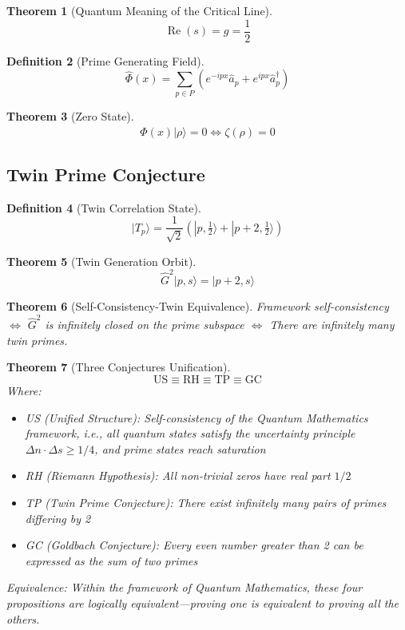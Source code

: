 \documentclass[12pt]{article}
\newtheorem{theorem}{Theorem}[section]
\theoremstyle{definition}
\newtheorem{definition}[theorem]{Definition}
\begin{document}
\begin{theorem}[Quantum Meaning of the Critical Line]
\[
\operatorname{Re}(s) = g = \frac{1}{2}
\]
\end{theorem}

\begin{definition}[Prime Generating Field]
\[
\hat{\Phi}(x) = \sum_{p \in P} \left( e^{-ipx} \hat{a}_p + e^{ipx} \hat{a}_p^\dagger \right)
\]
\end{definition}

\begin{theorem}[Zero State]
\[
\hat{\Phi}(x)|\rho\rangle = 0 \iff \zeta(\rho) = 0
\]
\end{theorem}

\subsection{Twin Prime Conjecture}

\begin{definition}[Twin Correlation State]
\[
|T_p\rangle = \frac{1}{\sqrt{2}} \left( |p, \tfrac{1}{2}\rangle + |p+2, \tfrac{1}{2}\rangle \right)
\]
\end{definition}

\begin{theorem}[Twin Generation Orbit]
\[
\hat{G}^2|p,s\rangle = |p+2,s\rangle
\]
\end{theorem}

\begin{theorem}[Self-Consistency-Twin Equivalence]
Framework self-consistency \(\iff\) \(\hat{G}^2\) is infinitely closed on the prime subspace \(\iff\) There are infinitely many twin primes.
\end{theorem}

\begin{theorem}[Three Conjectures Unification]
\[
\boxed{\text{US} \equiv \text{RH} \equiv \text{TP} \equiv \text{GC}}
\]
Where:
\begin{itemize}
    \item US (Unified Structure): Self-consistency of the Quantum Mathematics framework, i.e., all quantum states satisfy the uncertainty principle \(\Delta n \cdot \Delta s \geq 1/4\), and prime states reach saturation
    \item RH (Riemann Hypothesis): All non-trivial zeros have real part \(1/2\)
    \item TP (Twin Prime Conjecture): There exist infinitely many pairs of primes differing by 2
    \item GC (Goldbach Conjecture): Every even number greater than 2 can be expressed as the sum of two primes
\end{itemize}
Equivalence: Within the framework of Quantum Mathematics, these four propositions are logically equivalent—proving one is equivalent to proving all the others.
\end{theorem}
\end{document}
